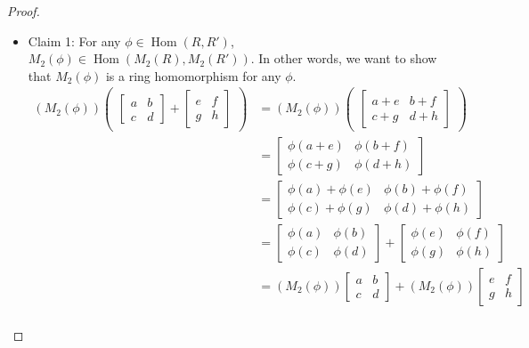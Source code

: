 \documentclass[12pt, psamsfonts]{amsart}
\theoremstyle{definition}
\theoremstyle{remark}
\DeclareMathOperator{\Hom}{Hom}
\numberwithin{equation}{section}
\begin{document}
\begin{proof}
 \begin{itemize}
   \item
     Claim 1: For any $\phi \in \Hom(R, R')$, $M_2(\phi) \in \Hom(M_2(R), M_2(R'))$.
     In other words, we want to show that $M_2(\phi)$ is a ring homomorphism for any $\phi$.
     \begin{align*}
       (M_2(\phi))\begin{pmatrix}\begin{bmatrix} a & b \\ c & d \end{bmatrix} + \begin{bmatrix} e & f \\ g & h \end{bmatrix} \end{pmatrix} 
         &= (M_2(\phi))\begin{pmatrix}\begin{bmatrix} a + e & b + f \\ c + g & d + h \end{bmatrix} \end{pmatrix} \\
         &= \begin{bmatrix} \phi(a + e) & \phi(b + f) \\ \phi(c + g) & \phi(d + h) \end{bmatrix} \\
         &= \begin{bmatrix} \phi(a) + \phi(e) & \phi(b) + \phi(f) \\ \phi(c) + \phi(g) & \phi(d) + \phi(h) \end{bmatrix} \\
         &= \begin{bmatrix} \phi(a) & \phi(b) \\ \phi(c) & \phi(d) \end{bmatrix} + \begin{bmatrix} \phi(e) & \phi(f) \\ \phi(g) & \phi(h) \end{bmatrix} \\
         &= (M_2(\phi))\begin{bmatrix} a & b \\ c & d \end{bmatrix} + (M_2(\phi))\begin{bmatrix} e & f \\ g & h \end{bmatrix} \\
     \end{align*}

\end{itemize}
\end{proof}
\end{document}

